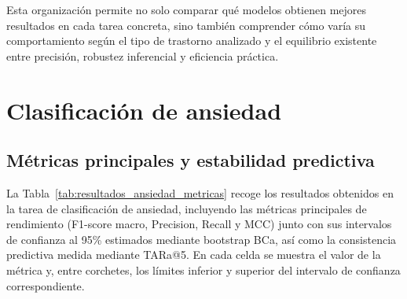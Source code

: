 Esta organización permite no solo comparar qué modelos obtienen mejores resultados en cada tarea concreta, sino también comprender cómo varía su comportamiento según el tipo de trastorno analizado y el equilibrio existente entre precisión, robustez inferencial y eficiencia práctica.

\section{Clasificación de ansiedad}

\subsection{Métricas principales y estabilidad predictiva}
La Tabla~\ref{tab:resultados_ansiedad_metricas} recoge los resultados obtenidos en la tarea de clasificación de ansiedad, incluyendo las métricas principales de rendimiento (F1-score macro, Precision, Recall y \ac{MCC}) junto con sus intervalos de confianza al 95\% estimados mediante bootstrap \ac{BCa}, así como la consistencia predictiva medida mediante \ac{TARa@5}. En cada celda se muestra el valor de la métrica y, entre corchetes, los límites inferior y superior del intervalo de confianza correspondiente.


